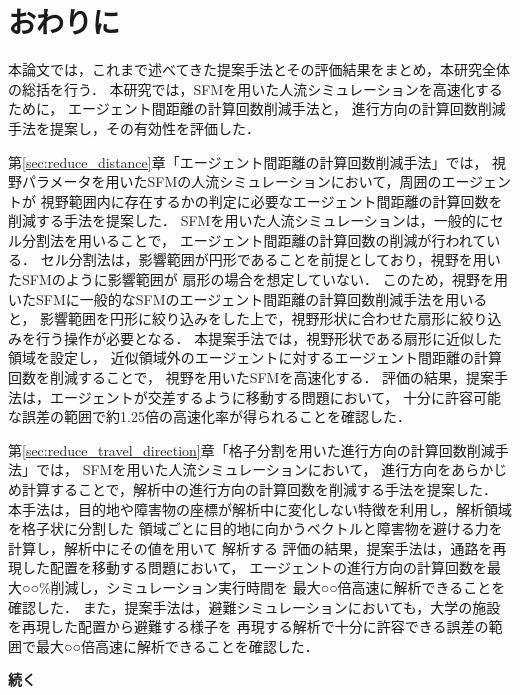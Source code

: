 \chapter{おわりに}
\label{sec:discuss}
本論文では，これまで述べてきた提案手法とその評価結果をまとめ，本研究全体の総括を行う．
本研究では，SFMを用いた人流シミュレーションを高速化するために，
エージェント間距離の計算回数削減手法と，
進行方向の計算回数削減手法を提案し，その有効性を評価した．

第\ref{sec:reduce_distance}章「エージェント間距離の計算回数削減手法」では，
視野パラメータを用いたSFMの人流シミュレーションにおいて，周囲のエージェントが
視野範囲内に存在するかの判定に必要なエージェント間距離の計算回数を削減する手法を提案した．
SFMを用いた人流シミュレーションは，一般的にセル分割法を用いることで，
エージェント間距離の計算回数の削減が行われている．
セル分割法は，影響範囲が円形であることを前提としており，視野を用いたSFMのように影響範囲が
扇形の場合を想定していない．
このため，視野を用いたSFMに一般的なSFMのエージェント間距離の計算回数削減手法を用いると，
影響範囲を円形に絞り込みをした上で，視野形状に合わせた扇形に絞り込みを行う操作が必要となる．
本提案手法では，視野形状である扇形に近似した領域を設定し，
近似領域外のエージェントに対するエージェント間距離の計算回数を削減することで，
視野を用いたSFMを高速化する．
評価の結果，提案手法は，エージェントが交差するように移動する問題において，
十分に許容可能な誤差の範囲で約1.25倍の高速化率が得られることを確認した．


第\ref{sec:reduce_travel_direction}章「格子分割を用いた進行方向の計算回数削減手法」では，
SFMを用いた人流シミュレーションにおいて，
進行方向をあらかじめ計算することで，解析中の進行方向の計算回数を削減する手法を提案した．
本手法は，目的地や障害物の座標が解析中に変化しない特徴を利用し，解析領域を格子状に分割した
領域ごとに目的地に向かうベクトルと障害物を避ける力を計算し，解析中にその値を用いて
解析する
評価の結果，提案手法は，通路を再現した配置を移動する問題において，
エージェントの進行方向の計算回数を最大○○\%削減し，シミュレーション実行時間を
最大○○倍高速に解析できることを確認した．
また，提案手法は，避難シミュレーションにおいても，大学の施設を再現した配置から避難する様子を
再現する解析で十分に許容できる誤差の範囲で最大○○倍高速に解析できることを確認した．

\textbf{続く}




% 
%
